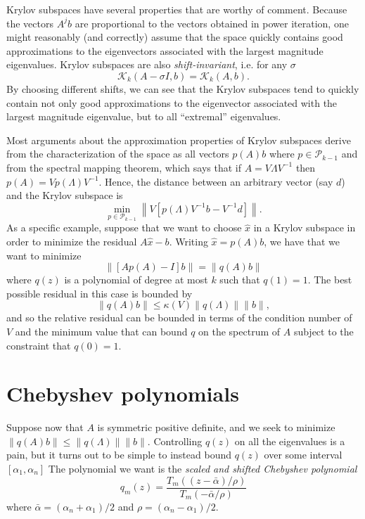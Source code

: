 \documentclass[12pt, leqno]{article} %
\begin{document}
Krylov subspaces have several properties that are worthy of comment.
Because the vectors $A^{j} b$ are proportional to the vectors obtained
in power iteration, one might reasonably (and correctly)
assume that the space quickly contains good approximations to the
eigenvectors associated with the largest magnitude eigenvalues.
Krylov subspaces are also {\em shift-invariant}, i.e. for any $\sigma$
\[
  \mathcal{K}_k(A-\sigma I, b) = \mathcal{K}_k(A,b).
\]
By choosing different shifts, we can see that the Krylov subspaces
tend to quickly contain not only good approximations to the eigenvector
associated with the largest magnitude eigenvalue, but to all
``extremal'' eigenvalues.

Most arguments about the approximation properties of Krylov subspaces
derive from the characterization of the space as all vectors $p(A) b$
where $p \in \mathcal{P}_{k-1}$ and from the spectral mapping theorem,
which says that if $A = V \Lambda V^{-1}$ then
$p(A) = V p(\Lambda) V^{-1}$.  Hence, the distance between
an arbitrary vector (say $d$) and the Krylov subspace is
\[
  \min_{p \in \mathcal{P}_{k-1}}
  \left\| V \left[ p(\Lambda) V^{-1} b - V^{-1} d \right] \right\|.
\]
As a specific example, suppose that we want to choose $\hat{x}$
in a Krylov subspace in order to minimize the residual $A \hat{x} - b$.
Writing $\hat{x} = p(A) b$, we have that we want to minimize
\[
  \|[A p(A)-I] b\| = \|q(A) b\|
\]
where $q(z)$ is a polynomial of degree at most $k$ such that $q(1) = 1$.
The best possible residual in this case is bounded by
\[
  \|q(A) b\| \leq \kappa(V) \|q(\Lambda)\| \|b\|,
\]
and so the relative residual can be bounded in terms of the condition
number of $V$ and the minimum value that can bound $q$ on the spectrum
of $A$ subject to the constraint that $q(0) = 1$.

\section{Chebyshev polynomials}

Suppose now that $A$ is symmetric positive definite, and we seek to
minimize $\|q(A) b\| \leq \|q(\Lambda)\| \|b\|$.  Controlling $q(z)$
on all the eigenvalues is a pain, but it turns out to be simple to
instead bound $q(z)$ over some interval $[\alpha_1, \alpha_n]$
The polynomial we want is the {\em scaled and shifted Chebyshev polynomial}
\[
  q_m(z) =
  \frac{T_m\left( (z-\bar{\alpha})/\rho \right)}
       {T_m\left( -\bar{\alpha}/\rho \right)}
\]
where $\bar{\alpha} = (\alpha_n + \alpha_1)/2$ and
$\rho = (\alpha_n-\alpha_1)/2$.
\end{document}
